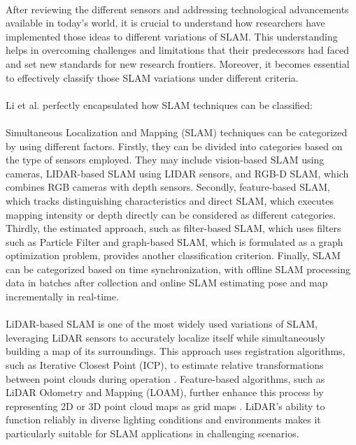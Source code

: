 \paragraph*{}
After reviewing the different sensors and addressing technological advancements available in today’s world, it is crucial to understand how researchers have implemented those ideas to different variations of SLAM. This understanding helps in overcoming challenges and limitations that their predecessors had faced and set new standards for new research frontiers. Moreover, it becomes essential to effectively classify those SLAM variations under different criteria.

\paragraph*{}
Li et al.\cite{li2024object} perfectly encapsulated how SLAM techniques can be classified: 

\paragraph*{}
Simultaneous Localization and Mapping (SLAM) techniques can be categorized by using different factors. Firstly, they can be divided into categories based on the type of sensors employed. They may include vision-based SLAM using cameras, LIDAR-based SLAM using LIDAR sensors, and RGB-D SLAM, which combines RGB cameras with depth sensors. Secondly, feature-based SLAM, which tracks distinguishing characteristics and direct SLAM, which executes mapping intensity or depth directly can be considered as different categories. Thirdly, the estimated approach, such as filter-based SLAM, which uses filters such as Particle Filter and graph-based SLAM, which is formulated as a graph optimization problem, provides another classification criterion. Finally, SLAM can be categorized based on time synchronization, with offline SLAM processing data in batches after collection and online SLAM estimating pose and map incrementally in real-time.

\paragraph*{} LiDAR-based SLAM is one of the most widely used variations of SLAM, leveraging LiDAR sensors to accurately localize itself while simultaneously building a map of its surroundings. This approach uses registration algorithms, such as Iterative Closest Point (ICP), to estimate relative transformations between point clouds during operation \cite{gu2020review}. Feature-based algorithms, such as LiDAR Odometry and Mapping (LOAM), further enhance this process by representing 2D or 3D point cloud maps as grid maps \cite{zhang2014loam}. LiDAR’s ability to function reliably in diverse lighting conditions and environments makes it particularly suitable for SLAM applications in challenging scenarios.

